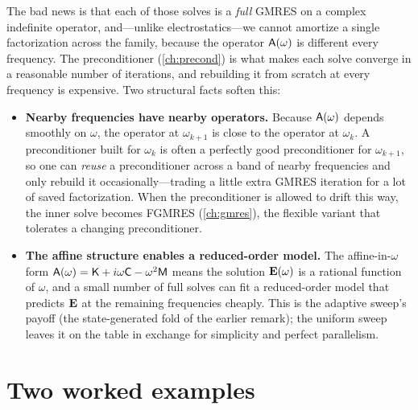 The bad news is that each of those solves is a \emph{full} GMRES on a complex
indefinite operator, and---unlike electrostatics---we cannot amortize a single
factorization across the family, because the operator $\mathsf{A}(\omega)$ is
different every frequency. The preconditioner (\cref{ch:precond}) is what makes
each solve converge in a reasonable number of iterations, and rebuilding it from
scratch at every frequency is expensive. Two structural facts soften this:
\begin{itemize}[nosep]
  \item \textbf{Nearby frequencies have nearby operators.} Because
  $\mathsf{A}(\omega)$ depends smoothly on $\omega$, the operator at $\omega_{k+1}$ is
  close to the operator at $\omega_k$. A preconditioner built for $\omega_k$ is
  often a perfectly good preconditioner for $\omega_{k+1}$, so one can \emph{reuse}
  a preconditioner across a band of nearby frequencies and only rebuild it
  occasionally---trading a little extra GMRES iteration for a lot of saved
  factorization. When the preconditioner is allowed to drift this way, the inner
  solve becomes FGMRES (\cref{ch:gmres}), the flexible variant that tolerates a
  changing preconditioner.
  \item \textbf{The affine structure enables a reduced-order model.} The
  affine-in-$\omega$ form $\mathsf{A}(\omega) = \mathsf{K} + i\omega\mathsf{C} - \omega^2\mathsf{M}$
  means the solution $\mathbf{E}(\omega)$ is a rational function of $\omega$, and a small
  number of full solves can fit a reduced-order model that predicts $\mathbf{E}$ at the
  remaining frequencies cheaply. This is the adaptive sweep's payoff (the
  state-generated fold of the earlier remark); the uniform sweep leaves it on the
  table in exchange for simplicity and perfect parallelism.
\end{itemize}

\section{Two worked examples}

